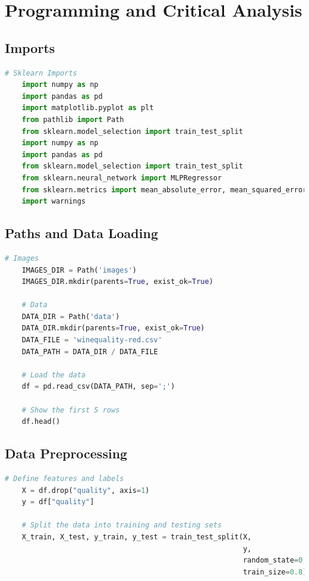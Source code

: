 \documentclass{article}
\begin{document}
\newpage

\section*{Programming and Critical Analysis}

\subsection*{Imports}

\begin{lstlisting}[language=Python]
    # Sklearn Imports
    import numpy as np
    import pandas as pd
    import matplotlib.pyplot as plt
    from pathlib import Path
    from sklearn.model_selection import train_test_split
    import numpy as np
    import pandas as pd
    from sklearn.model_selection import train_test_split
    from sklearn.neural_network import MLPRegressor
    from sklearn.metrics import mean_absolute_error, mean_squared_error
    import warnings
\end{lstlisting}

\subsection*{Paths and Data Loading}

\begin{lstlisting}[language=Python]
    # Images
    IMAGES_DIR = Path('images')
    IMAGES_DIR.mkdir(parents=True, exist_ok=True)

    # Data
    DATA_DIR = Path('data')
    DATA_DIR.mkdir(parents=True, exist_ok=True)
    DATA_FILE = 'winequality-red.csv'
    DATA_PATH = DATA_DIR / DATA_FILE

    # Load the data
    df = pd.read_csv(DATA_PATH, sep=';')

    # Show the first 5 rows
    df.head()
\end{lstlisting}

\subsection*{Data Preprocessing}

\begin{lstlisting}[language=Python]
    # Define features and labels 
    X = df.drop("quality", axis=1)
    y = df["quality"]

    # Split the data into training and testing sets
    X_train, X_test, y_train, y_test = train_test_split(X,
                                                        y,
                                                        random_state=0,
                                                        train_size=0.8)
\end{lstlisting}
\end{document}
